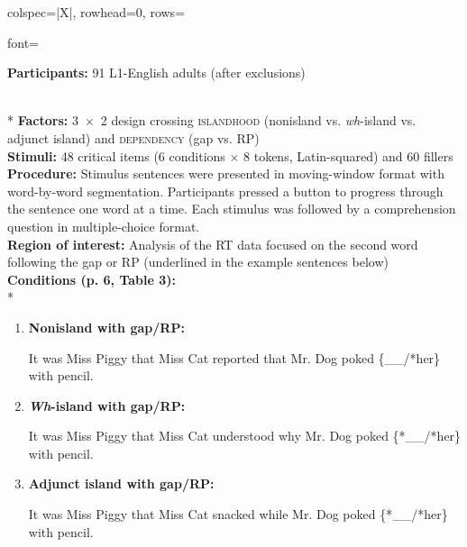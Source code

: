 
\begin{longtblr}[caption={\textcite{morgan.etal2020}: Self-paced reading task}, label={tblr:morgan}]{colspec={|X|}, rowhead=0, rows={font=\raggedright{}}}\hline
\textbf{Participants:} 91 L1-English adults (after exclusions) \vspace{5pt}\rule{0pt}{10pt}\\*
\textbf{Factors:} 3~×~2 design crossing \textsc{islandhood} (nonisland vs. \textit{wh}-island vs. adjunct island) and \textsc{dependency} (gap vs. RP) \vspace{5pt}\\
\textbf{Stimuli:} 48 critical items (6 conditions × 8 tokens, Latin-squared) and 60 fillers \vspace{5pt}\\
\textbf{Procedure:} Stimulus sentences were presented in moving-window format with word-by-word segmentation. Participants pressed a button to progress through the sentence one word at a time. Each stimulus was followed by a comprehension question in multiple-choice format. \vspace{5pt}\\
\textbf{Region of interest:} Analysis of the RT data focused on the second word following the gap or RP (underlined in the example sentences below) \vspace{5pt}\\
\textbf{Conditions (p. 6, Table 3):} \vspace{5pt}\\*
\begin{varwidth}{\linewidth}\begin{enumerate}[\bfseries (a),itemsep=5pt] 
\item \textbf{Nonisland with gap/RP:}\par\nobreak
It was Miss Piggy that Miss Cat reported that Mr. Dog poked \{\_\_/*her\} with  pencil.
\item \textbf{\textit{Wh}-island with gap/RP:}\par\nobreak
It was Miss Piggy that Miss Cat understood why Mr. Dog poked \{*\_\_/*her\} with  pencil.
\item \textbf{Adjunct island with gap/RP:}\par\nobreak
It was Miss Piggy that Miss Cat snacked while Mr. Dog poked \{*\_\_/*her\} with  pencil.
\end{enumerate}\end{varwidth}\vspace{5pt}\\

\end{longtblr}
